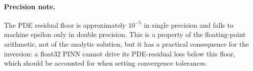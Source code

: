 \paragraph{Precision note.}
The PDE residual floor is approximately $10^{-5}$ in single precision and
falls to machine epsilon only in double precision. This is a property of
the floating-point arithmetic, not of the analytic solution, but it has a
practical consequence for the inversion: a float32 PINN cannot drive its
PDE-residual loss below this floor, which should be accounted for when
setting convergence tolerances.
